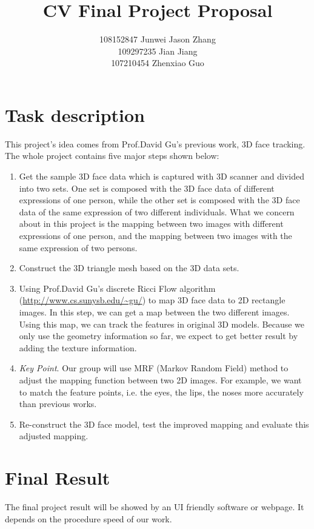 \documentclass[11pt]{article}
\author{108152847 Junwei Jason Zhang \\ 109297235 Jian Jiang \\107210454 Zhenxiao Guo}
\title{CV Final Project Proposal}
\begin{document}
\maketitle
\section{Task description}
This project's idea  comes from Prof.David Gu's previous work, 3D face tracking. The whole project contains five major steps shown below:
\begin{enumerate}
\item 
Get the sample 3D face data which is captured with 3D scanner and divided into two sets. One set is composed with the 3D face data of different expressions of one person, while the other set is composed with the 3D face data of the same expression of two different individuals. What we concern about in this project is the mapping between two images with different expressions of one person, and the mapping between two images with the same expression of two persons.
\item
Construct the 3D triangle mesh based on the 3D data sets.
\item
Using Prof.David Gu's discrete Ricci Flow algorithm (\url{http://www.cs.sunysb.edu/~gu/}) to map 3D face data to 2D rectangle images. In this step, we can get a map between the two different images. Using this map, we can track the features in original 3D models. Because we only use the geometry information so far, we expect to get better result by adding the texture information.
\item \emph{Key Point}.
Our group will use MRF (Markov Random Field) method to adjust the mapping function between two 2D images. For example, we want to match the feature points, i.e. the eyes, the lips, the noses more accurately than previous works. 
\item
Re-construct the 3D face model, test the improved mapping and evaluate this adjusted mapping.
\end{enumerate}
\section{Final Result}
The final project result will be showed by an UI friendly software or webpage. It depends on the procedure speed of our work.
\end{document}
